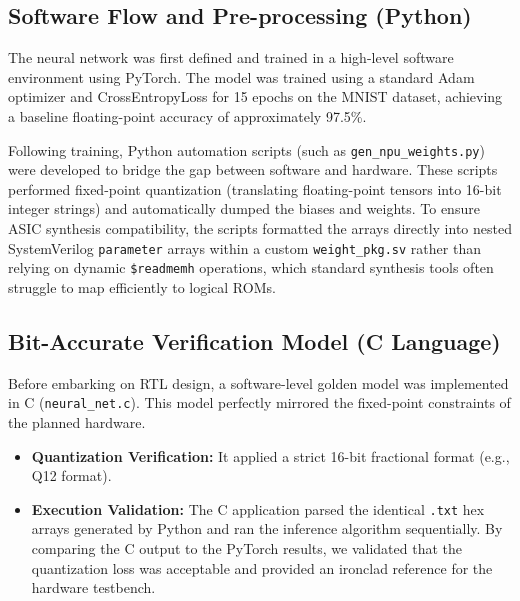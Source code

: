 \subsection{Software Flow and Pre-processing (Python)}
The neural network was first defined and trained in a high-level software environment using PyTorch. The model was trained using a standard Adam optimizer and CrossEntropyLoss for 15 epochs on the MNIST dataset, achieving a baseline floating-point accuracy of approximately 97.5\%.

Following training, Python automation scripts (such as \texttt{gen\_npu\_weights.py}) were developed to bridge the gap between software and hardware. These scripts performed fixed-point quantization (translating floating-point tensors into 16-bit integer strings) and automatically dumped the biases and weights. To ensure ASIC synthesis compatibility, the scripts formatted the arrays directly into nested SystemVerilog \texttt{parameter} arrays within a custom \texttt{weight\_pkg.sv} rather than relying on dynamic \texttt{\$readmemh} operations, which standard synthesis tools often struggle to map efficiently to logical ROMs. 

\subsection{Bit-Accurate Verification Model (C Language)}
Before embarking on RTL design, a software-level golden model was implemented in C (\texttt{neural\_net.c}). This model perfectly mirrored the fixed-point constraints of the planned hardware.
\begin{itemize}
    \item \textbf{Quantization Verification:} It applied a strict 16-bit fractional format (e.g., Q12 format). 
    \item \textbf{Execution Validation:} The C application parsed the identical \texttt{.txt} hex arrays generated by Python and ran the inference algorithm sequentially. By comparing the C output to the PyTorch results, we validated that the quantization loss was acceptable and provided an ironclad reference for the hardware testbench.
\end{itemize}

